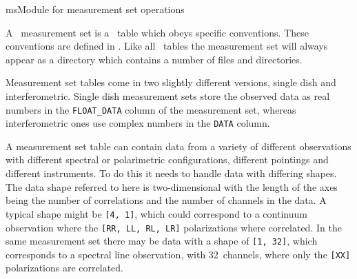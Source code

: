 \providecommand{\dataSelectionURL}{http://almasw.hq.eso.org/almasw/bin/view/OFFLINE/DataSelection}
\begin{ahmodule}{ms}{Module for measurement set operations}

\begin{ahdescription}
  A \casa\ measurement set is a \casa\ table which obeys
  specific conventions. These conventions are defined in
  . Like all
  \casa\ tables the measurement set will always appear as a
  directory which contains a number of files and directories.

  Measurement set tables come in two slightly different versions,
  single dish and interferometric. Single dish measurement sets
  store the observed data as real numbers in the \verb|FLOAT_DATA|
  column of the measurement set, whereas interferometric ones use
  complex numbers in the \verb|DATA| column.

  A measurement set table can contain data from a variety of
  different observations with different spectral or polarimetric
  configurations, different pointings and different instruments. To
  do this it needs to handle data with differing shapes. The data
  shape referred to here is two-dimensional with the length of the
  axes being the number of correlations and the number of channels
  in the data. A typical shape might be \verb|[4, 1]|, which could
  correspond to a continuum observation where the
  \verb|[RR, LL, RL, LR]| polarizations where correlated. In the
  same measurement set there may be data with a shape of
  \verb|[1, 32]|, which corresponds to a spectral line observation,
  with 32~channels, where only the \verb|[XX]| polarizations are
  correlated.

\end{ahdescription}

\ahobjs{}
\ahfuncs{}



\end{ahmodule}
